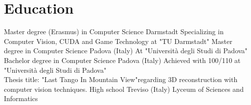 \documentclass[letterpaper]{twentysecondcv} %
\begin{document}
\section{Education}

\begin{twenty} %
		{Master degree (Erasmus) in Computer Science}	{Darmstadt}
		{Specializing in Computer Vision, CUDA and Game Technology at "TU Darmstadt"\footnotemarkA[1]}
		{Master degree in Computer Science}	{Padova (Italy)}
		{At "Università degli Studi di Padova"\footnotemarkA[2]}
		{Bachelor degree in Computer Science}	{Padova (Italy)}
		{Achieved with 100/110 at "Università degli Studi di Padova"\footnotemarkA[2]\\
		Thesis title: "Last Tango In Mountain View"\footnotemarkA[3] regarding 3D reconstruction with computer vision techniques.}
		{High school}	{Treviso (Italy)}
		{Lyceum of Sciences and Informatics}
\end{twenty}







\end{document}
